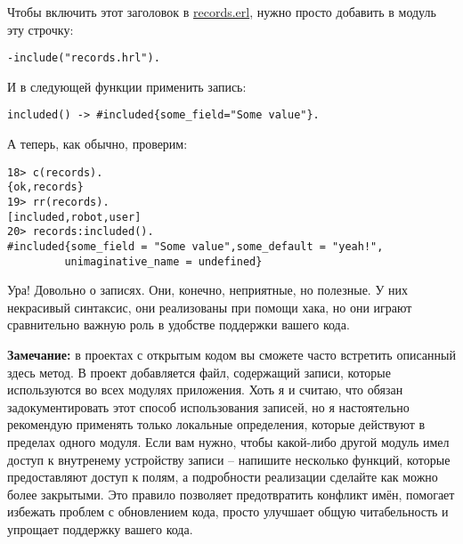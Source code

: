 Чтобы включить этот заголовок в \href{http://learnyousomeerlang.com/static/erlang/records.erl}{records.erl}, нужно просто добавить в модуль эту строчку:
\begin{lstlisting}[style=erlang,]
-include("records.hrl").
\end{lstlisting}

И в следующей функции применить запись:
\begin{lstlisting}[style=erlang]
included() -> #included{some_field="Some value"}.
\end{lstlisting}

А теперь, как обычно, проверим:
\begin{lstlisting}[style=erlang]
18> c(records).
{ok,records}
19> rr(records).
[included,robot,user]
20> records:included().
#included{some_field = "Some value",some_default = "yeah!",
         unimaginative_name = undefined}
\end{lstlisting}

Ура!
Довольно о записях.
Они, конечно,  неприятные, но полезные.
У них некрасивый синтаксис, они реализованы при помощи хака, но они играют сравнительно важную роль в удобстве поддержки вашего кода.\\
\colorbox{lgray}
{
\begin{minipage}{1.0\linewidth}
    \textbf{Замечание:} в проектах с открытым кодом вы сможете часто встретить описанный здесь метод.
В проект добавляется  файл, содержащий записи, которые используются во всех модулях приложения.
Хоть я и считаю, что обязан задокументировать этот способ использования записей, но я настоятельно рекомендую применять только локальные определения, которые действуют в пределах одного модуля.
Если вам нужно, чтобы какой\--либо другой модуль имел доступ к внутренему устройству записи \--- напишите несколько функций, которые предоставляют доступ к полям, а подробности реализации сделайте как можно более закрытыми.
Это правило позволяет предотвратить конфликт имён, помогает избежать проблем с обновлением кода, просто улучшает общую читабельность и упрощает поддержку вашего кода.
\end{minipage}
}
